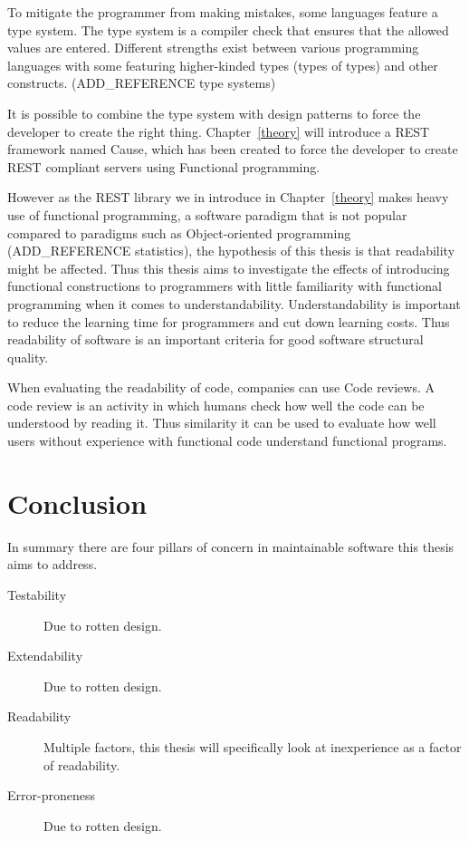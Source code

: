 To mitigate the programmer from making mistakes, some languages feature a type
system. The type system is a compiler check that ensures that the allowed values
are entered. Different strengths exist between various programming languages
with some featuring higher-kinded types (types of types) and other constructs.
(ADD\_REFERENCE type systems)

It is possible to combine the type system with design patterns to force the
developer to create the right thing. Chapter~\ref{theory} will introduce a REST
framework named Cause, which has been created to force the developer to create
REST compliant servers using Functional programming.

However as the REST library we in introduce in Chapter~\ref{theory} makes heavy
use of functional programming, a software paradigm that is not popular compared
to paradigms such as Object-oriented programming (ADD\_REFERENCE statistics),
the hypothesis of this thesis is that readability might be affected. Thus this
thesis aims to investigate the effects of introducing functional constructions
to programmers with little familiarity with functional programming when it comes
to understandability.  Understandability is important to reduce the learning
time for programmers and cut down learning costs. Thus readability of software
is an important criteria for good software structural quality.

When evaluating the readability of code, companies can use Code reviews. A code
review is an activity in which humans check how well the code can be understood
by reading it. Thus similarity it can be used to evaluate how well users without
experience with functional code understand functional programs. 

\section{Conclusion}\label{backgroundconclusion}

In summary there are four pillars of concern in maintainable software this
thesis aims to address.

\begin{description}
    \item[Testability] Due to rotten design.
    \item[Extendability] Due to rotten design.
    \item[Readability] Multiple factors, this thesis will specifically look at 
		inexperience as a factor of readability.
    \item[Error-proneness] Due to rotten design.
\end{description}

